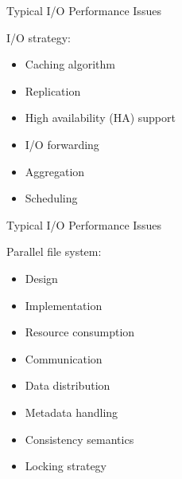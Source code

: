 \documentclass[compress,11pt,xcolor=svgnames,aspectratio=169]{beamer}
\begin{document}
\begin{frame}[t]{Typical I/O Performance Issues}

I/O strategy:

    \begin{itemize}
    \setlength\itemsep{0.3cm}
        \item Caching algorithm
        \item Replication
        \item High availability (HA) support
        \item I/O forwarding
        \item Aggregation
        \item Scheduling
    \end{itemize}

\nocite{SOPPOAASLK13}

\end{frame}

\begin{frame}[t]{Typical I/O Performance Issues}

Parallel file system:

    \begin{itemize}
    \setlength\itemsep{0.3cm}
        \item Design
        \item Implementation
        \item Resource consumption
        \item Communication
        \item Data distribution
        \item Metadata handling
        \item Consistency semantics
        \item Locking strategy
    \end{itemize}

\nocite{SOPPOAASLK13}

\end{frame}
\end{document}
